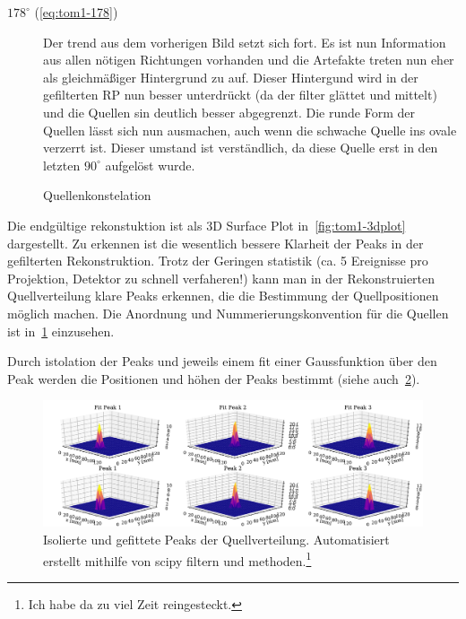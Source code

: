\documentclass[slug=PET, room=Andreas-Schubert-Bau\,\ 424A, supervisor=Carsten\ Bittrich, coursedate=10.\ 01.\ 2020]{../../Lab_Report_LaTeX/lab_report}
\begin{document}
\begin{description}
\item[\(178^\circ\) (\ref{eq:tom1-178})] Der trend aus dem vorherigen
  Bild setzt sich fort. Es ist nun Information aus allen n\"otigen
  Richtungen vorhanden und die Artefakte treten nun eher als
  gleichm\"a\ss{}iger Hintergrund zu auf. Dieser Hintergund wird in
  der gefilterten RP nun besser unterdr\"uckt (da der filter gl\"attet
  und mittelt) und die Quellen sin deutlich besser abgegrenzt. Die
  runde Form der Quellen l\"asst sich nun ausmachen, auch wenn die
  schwache Quelle ins ovale verzerrt ist. Dieser umstand ist
  verst\"andlich, da diese Quelle erst in den letzten \(90^\circ\)
  aufgel\"ost wurde.
\end{description}

\begin{figure}
  \centering

  \caption[Quellenkonstelation]{Quellenkonstelation}
  \label{fig:sourccof}
\end{figure}

Die endg\"ultige rekonstuktion ist als 3D Surface Plot
in~\ref{fig:tom1-3dplot} dargestellt. Zu erkennen ist die wesentlich
bessere Klarheit der Peaks in der gefilterten Rekonstruktion. Trotz
der Geringen statistik (ca. 5 Ereignisse pro Projektion, Detektor zu
schnell verfaheren!)  kann man in der Rekonstruierten Quellverteilung
klare Peaks erkennen, die die Bestimmung der Quellpositionen m\"oglich
machen. Die Anordnung und Nummerierungskonvention f\"ur die Quellen
ist in~\ref{fig:sourccof} einzusehen.

Durch istolation der Peaks und jeweils einem fit einer Gaussfunktion
\"uber den Peak werden die Positionen und h\"ohen der Peaks bestimmt
(siehe auch~\ref{fig:tom1-filtered_fit}).

\begin{figure}[h]\centering
  \includegraphics[width=\textwidth]{../auswertung/figs/tom1/filtered_fit.pdf}
  \caption[Fit der Peaks]{Isolierte und gefittete Peaks der
    Quellverteilung. Automatisiert erstellt mithilfe von scipy
    filtern und methoden.\footnote{Ich habe da zu viel Zeit reingesteckt.}}
  \label{fig:tom1-filtered_fit}
\end{figure}
\end{document}
